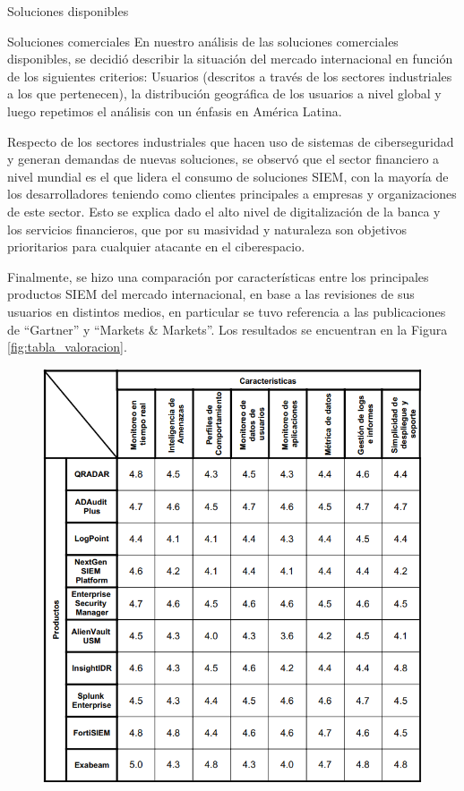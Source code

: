 \begin{section}{Soluciones disponibles}
\begin{subsection}{Soluciones comerciales}
        En nuestro análisis de las soluciones comerciales disponibles, se decidió describir la situación del mercado internacional en función de los siguientes criterios: 
        Usuarios (descritos a través de los sectores industriales a los que pertenecen), la distribución geográfica de los usuarios a nivel global y luego repetimos el análisis con un énfasis en América Latina. \par 
        Respecto de los sectores industriales que hacen uso de sistemas de ciberseguridad y generan demandas de nuevas soluciones, se observó que el sector financiero a nivel mundial es el que lidera el consumo de soluciones SIEM, con la mayoría de los desarrolladores teniendo como clientes principales a empresas y organizaciones de este sector. Esto se explica dado el alto nivel de digitalización de la banca y los servicios financieros, que por su masividad y naturaleza son objetivos prioritarios para cualquier atacante en el ciberespacio. \par
        Finalmente, se hizo una comparación por características entre los principales productos SIEM del mercado internacional, en base a las revisiones de sus usuarios en distintos medios, en particular se tuvo referencia a las publicaciones de “Gartner”\cite{ranking} y “Markets \& Markets”\cite{markets_markets}. 
        Los resultados se encuentran en la Figura \ref{fig:tabla_valoracion}.\par
        \protect
         \begin{figure}
            \centering
            \includegraphics[width=1\textwidth]{./marco_teorico_imagenes/tabla_3_valoracion.png}

\end{figure}
\end{subsection}
\end{section}
